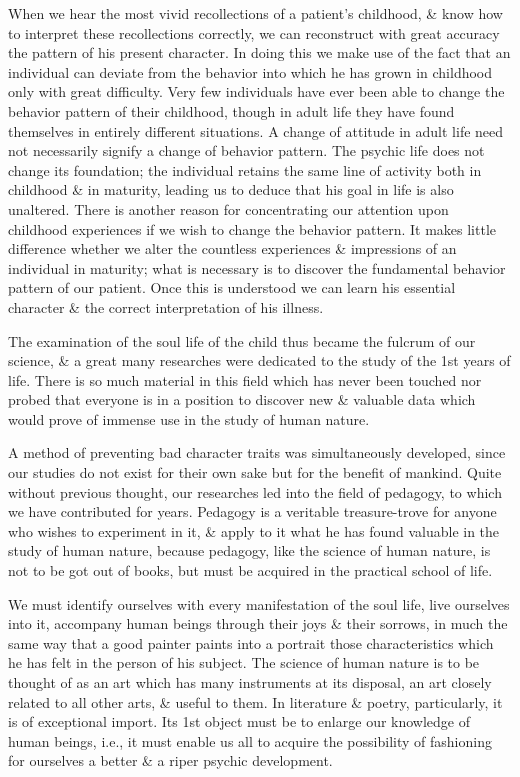 \documentclass{article}
\begin{document}
When we hear the most vivid recollections of a patient's childhood, \& know how to interpret these recollections correctly, we can reconstruct with great accuracy the pattern of his present character. In doing this we make use of the fact that an individual can deviate from the behavior into which he has grown in childhood only with great difficulty. Very few individuals have ever been able to change the behavior pattern of their childhood, though in adult life they have found themselves in entirely different situations. A change of attitude in adult life need not necessarily signify a change of behavior pattern. The psychic life does not change its foundation; the individual retains the same line of activity both in childhood \& in maturity, leading us to deduce that his goal in life is also unaltered. There is another reason for concentrating our attention upon childhood experiences if we wish to change the behavior pattern. It makes little difference whether we alter the countless experiences \& impressions of an individual in maturity; what is necessary is to discover the fundamental behavior pattern of our patient. Once this is understood we can learn his essential character \& the correct interpretation of his illness.

The examination of the soul life of the child thus became the fulcrum of our science, \& a great many researches were dedicated to the study of the 1st years of life. There is so much material in this field which has never been touched nor probed that everyone is in a position to discover new \& valuable data which would prove of immense use in the study of human nature.

A method of preventing bad character traits was simultaneously developed, since our studies do not exist for their own sake but for the benefit of mankind. Quite without previous thought, our researches led into the field of pedagogy, to which we have contributed for years. Pedagogy is a veritable treasure-trove for anyone who wishes to experiment in it, \& apply to it what he has found valuable in the study of human nature, because pedagogy, like the science of human nature, is not to be got out of books, but must be acquired in the practical school of life.

We must identify ourselves with every manifestation of the soul life, live ourselves into it, accompany human beings through their joys \& their sorrows, in much the same way that a good painter paints into a portrait those characteristics which he has felt in the person of his subject. The science of human nature is to be thought of as an art which has many instruments at its disposal, an art closely related to all other arts, \& useful to them. In literature \& poetry, particularly, it is of exceptional import. Its 1st object must be to enlarge our knowledge of human beings, i.e., it must enable us all to acquire the possibility of fashioning for ourselves a better \& a riper psychic development.
\end{document}
